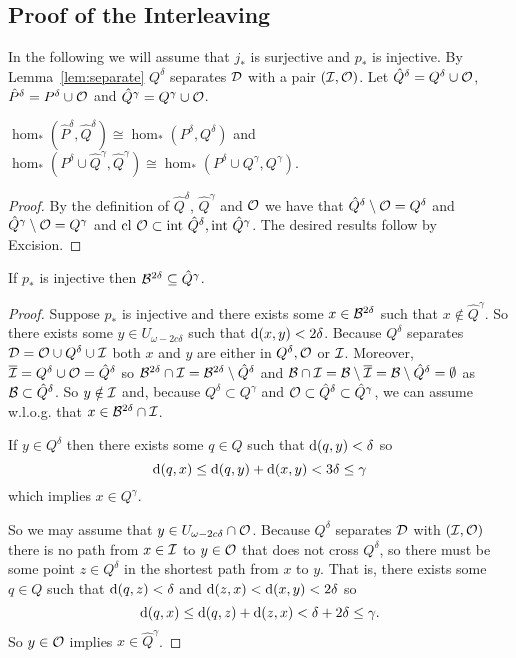 
\subsection{Proof of the Interleaving}

In the following we will assume that $j_*$ is surjective and $p_*$ is injective.
By Lemma~\ref{lem:separate} $Q^\delta$ separates ${\mathcal{D}}$ with a pair $({\mathcal{I}}, \mathcal{O})$.
Let $\hat{Q}^\delta = Q^\delta \cup \mathcal{O}$, $\hat{P}^\delta = P^\delta \cup \mathcal{O}$ and $\hat{Q}^\gamma = Q^\gamma \cup \mathcal{O}$.

\begin{lemma}
    $\hom_*(\hat{P}^\delta, \hat{Q}^\delta)\cong \hom_*(P^\delta, Q^\delta)$ and $\hom_*(P^\delta\cup\hat{Q}^\gamma, \hat{Q}^\gamma)\cong \hom_*(P^\delta\cup Q^\gamma, Q^\gamma)$.
\end{lemma}
\begin{proof}
    By the definition of $\hat{Q}^\delta$, $\hat{Q}^\gamma$ and $\mathcal{O}$ we have that $\hat{Q}^\delta\setminus\mathcal{O} = Q^\delta$ and $\hat{Q}^\gamma\setminus\mathcal{O} = Q^\gamma$ and $\mathrm{cl}~\mathcal{O} \subset \mathrm{int}~\hat{Q}^\delta, \mathrm{int}~\hat{Q}^\gamma$.
    The desired results follow by Excision.
\end{proof}

\begin{lemma}
    If $p_*$ is injective then ${\mathcal{B}}^{2\delta}\subseteq \hat{Q}^\gamma$.
\end{lemma}
\begin{proof}
    Suppose $p_*$ is injective and there exists some $x\in {\mathcal{B}}^{2\delta}$ such that $x\notin \hat{Q}^\gamma$.
    So there exists some $y\in U_{\omega - 2c\delta}$ such that $\mathrm{d}(x, y) < 2\delta$.
    Because $Q^\delta$ separates ${\mathcal{D}} = \mathcal{O} \cup Q^\delta \cup {\mathcal{I}}$ both $x$ and $y$ are either in $Q^\delta, \mathcal{O}$ or ${\mathcal{I}}$.
    Moreover, $\overline{{\mathcal{I}}} = Q^\delta \cup \mathcal{O} = \hat{Q}^\delta$ so ${\mathcal{B}}^{2\delta}\cap{\mathcal{I}} = {\mathcal{B}}^{2\delta}\setminus \hat{Q}^\delta$ and ${\mathcal{B}}\cap{\mathcal{I}} = {\mathcal{B}}\setminus \overline{{\mathcal{I}}} = {\mathcal{B}}\setminus \hat{Q}^\delta = \emptyset$ as ${\mathcal{B}}\subset \hat{Q}^\delta$.
    So $y\notin {\mathcal{I}}$ and, because $Q^\delta \subset Q^\gamma$ and $\mathcal{O}\subset \hat{Q}^\delta\subset\hat{Q}^\gamma$, we can assume w.l.o.g. that $x\in {\mathcal{B}}^{2\delta}\cap{\mathcal{I}}$.

    If $y\in Q^\delta$ then there exists some $q\in Q$ such that $\mathrm{d}(q, y) < \delta$ so
    \[ \mathrm{d}(q, x)\leq \mathrm{d}(q, y) + \mathrm{d}(x, y) < 3\delta\leq\gamma \]
    which implies $x \in Q^\gamma$.

    So we may assume that $y\in U_{\omega - 2c\delta}\cap\mathcal{O}$.
    Because $Q^\delta$ separates ${\mathcal{D}}$ with $({\mathcal{I}}, \mathcal{O})$ there is no path from $x\in {\mathcal{I}}$ to $y\in\mathcal{O}$ that does not cross $Q^\delta$, so there must be some point $z\in Q^\delta$ in the shortest path from $x$ to $y$.
    That is, there exists some $q\in Q$ such that $\mathrm{d}(q, z) < \delta$ and $\mathrm{d}(z, x) < \mathrm{d}(x, y) < 2\delta$ so
    \[ \mathrm{d}(q, x)\leq \mathrm{d}(q, z) + \mathrm{d}(z, x) < \delta + 2\delta \leq \gamma. \]
    So $y\in\mathcal{O}$ implies $x\in\hat{Q}^\gamma$.

\end{proof}

